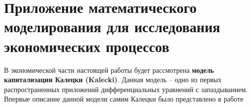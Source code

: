 \section{Приложение математического\\моделирования для исследования\\экономических процессов}

В экономической части настоящей работы будет рассмотрена \textbf{модель капитализации Калецки (Kalecki)}. Данная модель \--- одно из первых распространенных приложений дифференциальных уравнений с запаздыванием. Впервые описание данной модели самим Калецки было представлено в работе \cite{bib:Kalecki}